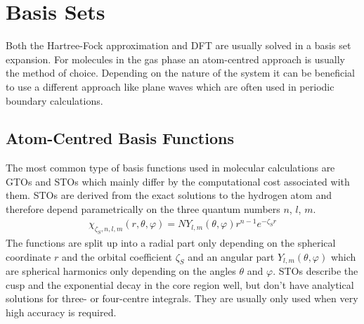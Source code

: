 \section{Basis Sets}
\label{sec:basissets}

Both the Hartree-Fock approximation and \ac{DFT} are usually solved in a basis
set expansion. For molecules in the gas phase an atom-centred approach is
usually the method of choice. Depending on the nature of the system it can be
beneficial to use a different approach like plane waves which are often used in
periodic boundary calculations.

\subsection{Atom-Centred Basis Functions}
\label{sec:AtomCentredBasisFunctions}

The most common type of basis functions used in molecular calculations are
\acp{GTO} and \acp{STO} which mainly differ by the computational cost associated
with them. \acp{STO} are derived from the exact solutions to the hydrogen atom
and therefore depend parametrically on the three quantum numbers $n$,
$l$, $m$.
%
\begin{align}
    \chi_{\zeta_S,n,l,m}(r,\theta,\varphi) = NY_{l,m}(\theta,\varphi)r^{n-1}e^{-\zeta_S r}
\end{align}
%
The functions are split up into a radial part only depending on the spherical
coordinate $r$ and the orbital coefficient $\zeta_S$ and an angular part
$Y_{l,m}(\theta,\varphi)$ which are spherical harmonics only depending on the
angles $\theta$ and $\varphi$. \acp{STO} describe the cusp and the exponential
decay in the core region well, but don't have analytical solutions for three-
or four-centre integrals. They are usually only used when very high accuracy
is required.

